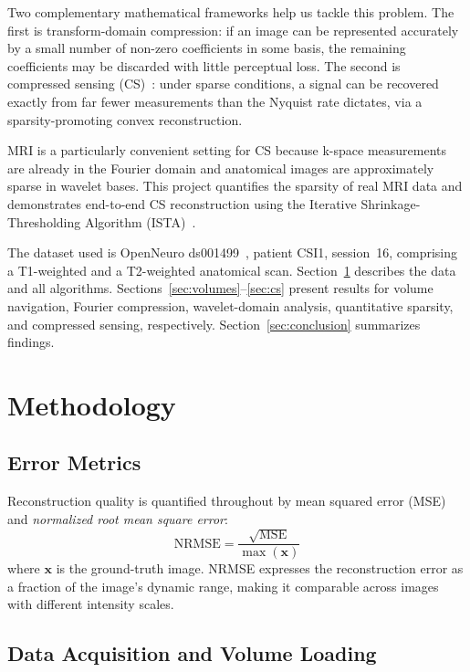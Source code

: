 \documentclass[10pt]{article}
\begin{document}
Two complementary mathematical frameworks help us tackle this problem.  The first is
transform-domain compression: if an image can be represented accurately by a
small number of non-zero coefficients in some basis, the remaining
coefficients may be discarded with little perceptual loss.  The second is
compressed sensing (CS)~\cite{candes2006robust, donoho2006compressed}: under
sparse conditions, a signal can be recovered exactly from far fewer
measurements than the Nyquist rate dictates, via a sparsity-promoting convex
reconstruction.

MRI is a particularly convenient setting for CS because k-space measurements
are already in the Fourier domain and anatomical images are approximately
sparse in wavelet bases.  This project quantifies the sparsity of real MRI
data and demonstrates end-to-end CS reconstruction using the Iterative
Shrinkage-Thresholding Algorithm (ISTA)~\cite{daubechies2004iterative}.

The dataset used is OpenNeuro ds001499~\cite{dataset}, patient CSI1,
session~16, comprising a T1-weighted and a T2-weighted anatomical scan.
Section~\ref{sec:methods} describes the data and all algorithms.
Sections~\ref{sec:volumes}--\ref{sec:cs} present results for volume
navigation, Fourier compression, wavelet-domain analysis, quantitative
sparsity, and compressed sensing, respectively.
Section~\ref{sec:conclusion} summarizes findings.


\section{Methodology}
\label{sec:methods}

\subsection{Error Metrics}

Reconstruction quality is quantified throughout by mean squared error (MSE)
and \emph{normalized root mean square error}:
\begin{equation}
  \mathrm{NRMSE} = \frac{\sqrt{\mathrm{MSE}}}{\max(\mathbf{x})}
  \label{eq:nrmse}
\end{equation}
where $\mathbf{x}$ is the ground-truth image. NRMSE expresses the
reconstruction error as a fraction of the image's dynamic range, making it
comparable across images with different intensity scales.

\subsection{Data Acquisition and Volume Loading}
\end{document}
